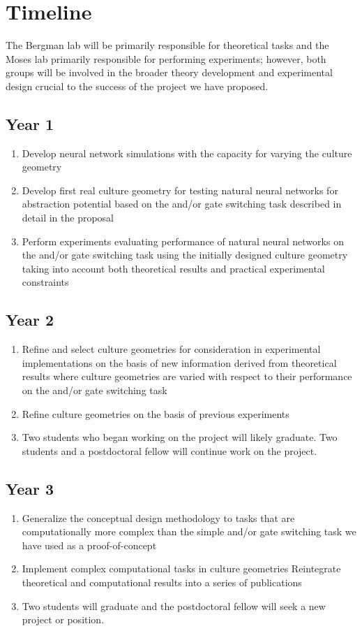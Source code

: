 \section{Timeline}
The Bergman lab will be primarily responsible for theoretical tasks and the Moses lab primarily responsible for performing experiments; however, both groups will be involved in the broader theory development and experimental design crucial to the success of the project we have proposed.

\subsection{Year 1}
\begin{enumerate}
\item Develop neural network simulations with the capacity for varying the culture geometry
\item Develop first real culture geometry for testing natural neural networks for abstraction potential based on the and/or gate switching task described in detail in the proposal
\item Perform experiments evaluating performance of natural neural networks on the and/or gate switching task using the initially designed culture geometry taking into account both theoretical results and practical experimental constraints
\end{enumerate}

\subsection{Year 2}
\begin{enumerate}
\item Refine and select culture geometries for consideration in experimental implementations on the basis of new information derived from theoretical results where culture geometries are varied with respect to their performance on the and/or gate switching task
\item Refine culture geometries on the basis of previous experiments
\item Two students who began working on the project will likely graduate. Two students and a postdoctoral fellow will continue work on the project.
\end{enumerate}

\subsection{Year 3}
\begin{enumerate}
\item Generalize the conceptual design methodology to tasks that are computationally more complex than the simple and/or gate switching task we have used as a proof-of-concept
\item Implement complex computational tasks in culture geometries 
Reintegrate theoretical and computational results into a series of publications
\item Two students will graduate and the postdoctoral fellow will seek a new project or position.
\end{enumerate}

